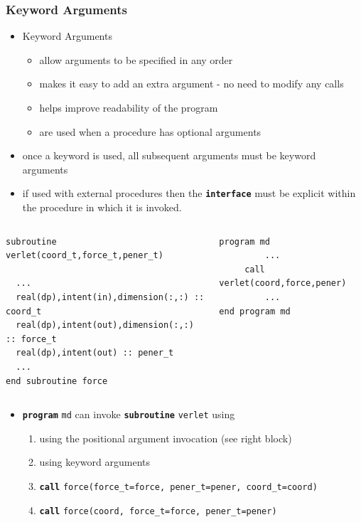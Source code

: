 \documentclass[slidestop,mathserif,compress,xcolor=svgnames]{beamer}
\newenvironment{eblock}[0]
{
\begin{beamerboxesrounded}[upper=uppercol2,lower=lowercol2,shadow=true]}
{\end{beamerboxesrounded}}
\begin{document}
\begin{frame}[fragile]
  \frametitle{\small Keyword Arguments}

  \begin{block}{}
    \begin{itemize}
      \item Keyword Arguments
      \begin{itemize}
        \item allow arguments to be specified in any order
        \item makes it easy to add an extra argument - no need to modify any calls
        \item helps improve readability of the program
        \item are used when a procedure has optional arguments
      \end{itemize}
      \item once a keyword is used, all subsequent arguments must be keyword arguments
      \item if used with external procedures then the \textbf{\texttt{interface}} must be explicit within the procedure in which it is invoked.
    \end{itemize}
  \end{block}
  {\fontsize{4}{5}
    \begin{columns}
      \column{5.5cm}
      \begin{eblock}{}
        \begin{verbatim}
subroutine verlet(coord_t,force_t,pener_t)

  ...
  real(dp),intent(in),dimension(:,:) :: coord_t
  real(dp),intent(out),dimension(:,:) :: force_t
  real(dp),intent(out) :: pener_t
  ...
end subroutine force
        \end{verbatim}
      \end{eblock}
      \column{5.5cm}
      \begin{eblock}{}
        \begin{verbatim}
program md
         ...
     call verlet(coord,force,pener)
         ...
end program md
        \end{verbatim}
      \end{eblock}
    \end{columns}
  }
  \begin{itemize}
    \item \textbf{\texttt{program}} \texttt{md} can invoke \textbf{\texttt{subroutine}} \texttt{verlet} using
    \begin{enumerate}
      \item using the positional argument invocation (see right block)
      \item using keyword arguments
      \item[] \textbf{\texttt{call}} \texttt{force(force\_t=force, pener\_t=pener, coord\_t=coord)}
      \item[] \textbf{\texttt{call}} \texttt{force(coord, force\_t=force, pener\_t=pener)}
    \end{enumerate}
  \end{itemize}
\end{frame}
\end{document}
